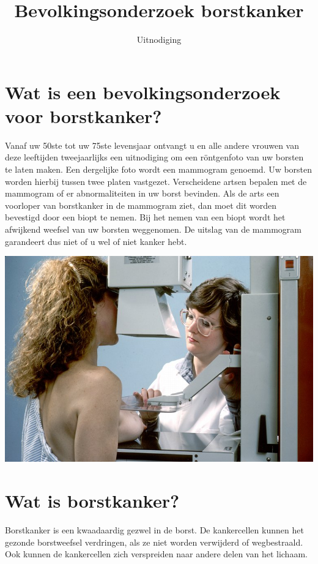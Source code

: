 \documentclass[a4paper,notumble]{leaflet}
\begin{document}
\begin{titlepage}
	\title{%
		\bf\sffamily\huge\color{purple!80!red}Bevolkingsonderzoek borstkanker
	}
	\author{%
		\sffamily Uitnodiging
	}
	\date{}
\end{titlepage}
\maketitle
\section{Wat is een bevolkingsonderzoek voor borstkanker?}
Vanaf uw 50ste tot uw 75ste levensjaar ontvangt u en alle andere vrouwen van deze leeftijden tweejaarlijks een uitnodiging om een röntgenfoto van uw borsten te laten maken. Een dergelijke foto wordt een mammogram genoemd. Uw borsten worden hierbij tussen twee platen vastgezet. Verscheidene artsen bepalen met de mammogram of er abnormaliteiten in uw borst bevinden. Als de arts een voorloper van borstkanker in de mammogram ziet, dan moet dit worden bevestigd door een biopt te nemen. Bij het nemen van een biopt wordt het afwijkend weefsel van uw borsten weggenomen. De uitslag van de mammogram garandeert dus niet of u wel of niet kanker hebt.
\vfil
\begin{center}
	\includegraphics[width=\textwidth]{mammogram_proced.jpg}
\end{center}
\newpage
\section{Wat is borstkanker?}
Borstkanker is een kwaadaardig gezwel in de borst. De kankercellen kunnen het gezonde borstweefsel verdringen, als ze niet worden verwijderd of wegbestraald. Ook kunnen de kankercellen zich verspreiden naar andere delen van het lichaam.
\end{document}

